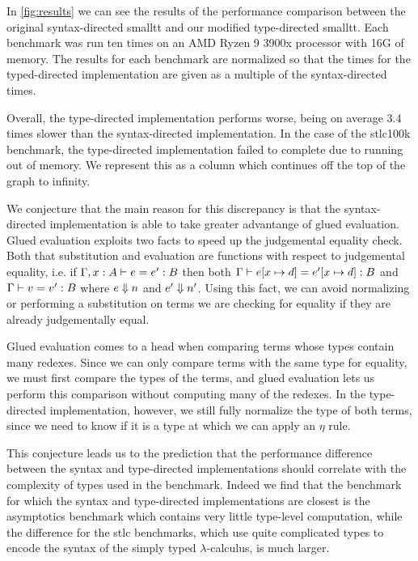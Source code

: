In \autoref{fig:results} we can see the results of the performance comparison between the original syntax-directed smalltt and our modified type-directed smalltt.
Each benchmark was run ten times on an AMD Ryzen 9 3900x processor with 16G of memory.
The results for each benchmark are normalized so that the times for the typed-directed implementation are given as a multiple of the syntax-directed times.

Overall, the type-directed implementation performs worse, being on average 3.4 times slower than the syntax-directed implementation.
In the case of the stlc100k benchmark, the type-directed implementation failed to complete due to running out of memory.
We represent this as a column which continues off the top of the graph to infinity.

We conjecture that the main reason for this discrepancy is that the syntax-directed implementation is able to take greater advantange of glued evaluation.
Glued evaluation exploits two facts to speed up the judgemental equality check.
Both that substitution and evaluation are functions with respect to judgemental equality, i.e. if $\Gamma, x : A \vdash e = e' : B$ then both $\Gamma \vdash e [x \mapsto d] = e' [x \mapsto d] : B$ and $\Gamma \vdash v = v' : B$ where $e \Downarrow n$ and $e' \Downarrow n'$.
Using this fact, we can avoid normalizing or performing a substitution on terms we are checking for equality if they are already judgementally equal.

Glued evaluation comes to a head when comparing terms whose types contain many redexes.
Since we can only compare terms with the same type for equality, we must first compare the types of the terms, and glued evaluation lets us perform this comparison without computing many of the redexes.
In the type-directed implementation, however, we still fully normalize the type of both terms, since we need to know if it is a type at which we can apply an $\eta$ rule.

This conjecture leads us to the prediction that the performance difference between the syntax and type-directed implementations should correlate with the complexity of types used in the benchmark.
Indeed we find that the benchmark for which the syntax and type-directed implementations are closest is the asymptotics benchmark which contains very little type-level computation, while the difference for the stlc benchmarks, which use quite complicated types to encode the syntax of the simply typed $\lambda$-calculus, is much larger.

